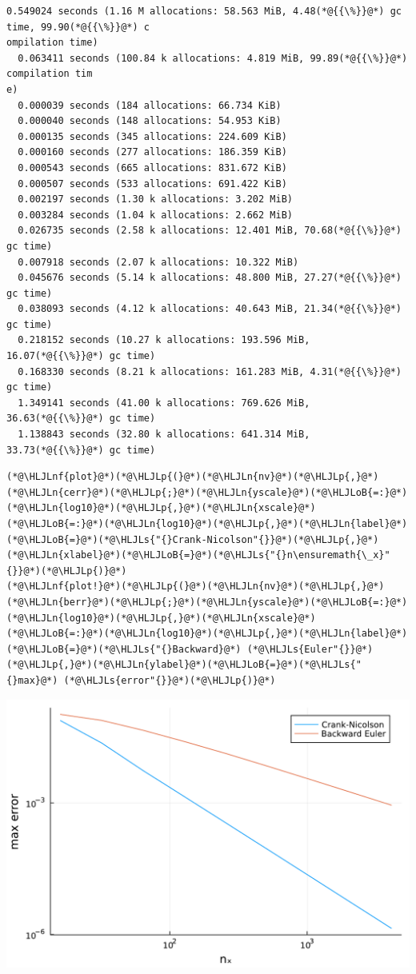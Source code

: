 \documentclass[12pt,a4paper]{article}
\newcommand{\HLJLn}[1]{#1}
\newcommand{\HLJLnf}[1]{\textcolor[RGB]{66,102,213}{#1}}
\newcommand{\HLJLs}[1]{\textcolor[RGB]{201,61,57}{#1}}
\newcommand{\HLJLoB}[1]{\textcolor[RGB]{102,102,102}{\textbf{#1}}}
\newcommand{\HLJLp}[1]{#1}
\begin{document}
\begin{lstlisting}
0.549024 seconds (1.16 M allocations: 58.563 MiB, 4.48(*@{{\%}}@*) gc time, 99.90(*@{{\%}}@*) c
ompilation time)
  0.063411 seconds (100.84 k allocations: 4.819 MiB, 99.89(*@{{\%}}@*) compilation tim
e)
  0.000039 seconds (184 allocations: 66.734 KiB)
  0.000040 seconds (148 allocations: 54.953 KiB)
  0.000135 seconds (345 allocations: 224.609 KiB)
  0.000160 seconds (277 allocations: 186.359 KiB)
  0.000543 seconds (665 allocations: 831.672 KiB)
  0.000507 seconds (533 allocations: 691.422 KiB)
  0.002197 seconds (1.30 k allocations: 3.202 MiB)
  0.003284 seconds (1.04 k allocations: 2.662 MiB)
  0.026735 seconds (2.58 k allocations: 12.401 MiB, 70.68(*@{{\%}}@*) gc time)
  0.007918 seconds (2.07 k allocations: 10.322 MiB)
  0.045676 seconds (5.14 k allocations: 48.800 MiB, 27.27(*@{{\%}}@*) gc time)
  0.038093 seconds (4.12 k allocations: 40.643 MiB, 21.34(*@{{\%}}@*) gc time)
  0.218152 seconds (10.27 k allocations: 193.596 MiB, 16.07(*@{{\%}}@*) gc time)
  0.168330 seconds (8.21 k allocations: 161.283 MiB, 4.31(*@{{\%}}@*) gc time)
  1.349141 seconds (41.00 k allocations: 769.626 MiB, 36.63(*@{{\%}}@*) gc time)
  1.138843 seconds (32.80 k allocations: 641.314 MiB, 33.73(*@{{\%}}@*) gc time)
\end{lstlisting}


\begin{lstlisting}
(*@\HLJLnf{plot}@*)(*@\HLJLp{(}@*)(*@\HLJLn{nv}@*)(*@\HLJLp{,}@*)(*@\HLJLn{cerr}@*)(*@\HLJLp{;}@*)(*@\HLJLn{yscale}@*)(*@\HLJLoB{=:}@*)(*@\HLJLn{log10}@*)(*@\HLJLp{,}@*)(*@\HLJLn{xscale}@*)(*@\HLJLoB{=:}@*)(*@\HLJLn{log10}@*)(*@\HLJLp{,}@*)(*@\HLJLn{label}@*)(*@\HLJLoB{=}@*)(*@\HLJLs{"{}Crank-Nicolson"{}}@*)(*@\HLJLp{,}@*)(*@\HLJLn{xlabel}@*)(*@\HLJLoB{=}@*)(*@\HLJLs{"{}n\ensuremath{\_x}"{}}@*)(*@\HLJLp{)}@*)
(*@\HLJLnf{plot!}@*)(*@\HLJLp{(}@*)(*@\HLJLn{nv}@*)(*@\HLJLp{,}@*)(*@\HLJLn{berr}@*)(*@\HLJLp{;}@*)(*@\HLJLn{yscale}@*)(*@\HLJLoB{=:}@*)(*@\HLJLn{log10}@*)(*@\HLJLp{,}@*)(*@\HLJLn{xscale}@*)(*@\HLJLoB{=:}@*)(*@\HLJLn{log10}@*)(*@\HLJLp{,}@*)(*@\HLJLn{label}@*)(*@\HLJLoB{=}@*)(*@\HLJLs{"{}Backward}@*) (*@\HLJLs{Euler"{}}@*)(*@\HLJLp{,}@*)(*@\HLJLn{ylabel}@*)(*@\HLJLoB{=}@*)(*@\HLJLs{"{}max}@*) (*@\HLJLs{error"{}}@*)(*@\HLJLp{)}@*)
\end{lstlisting}

\includegraphics[width=\linewidth]{jl_6qsifB/Chapter5_Exercises_Solutions_6_1.pdf}
\end{document}
